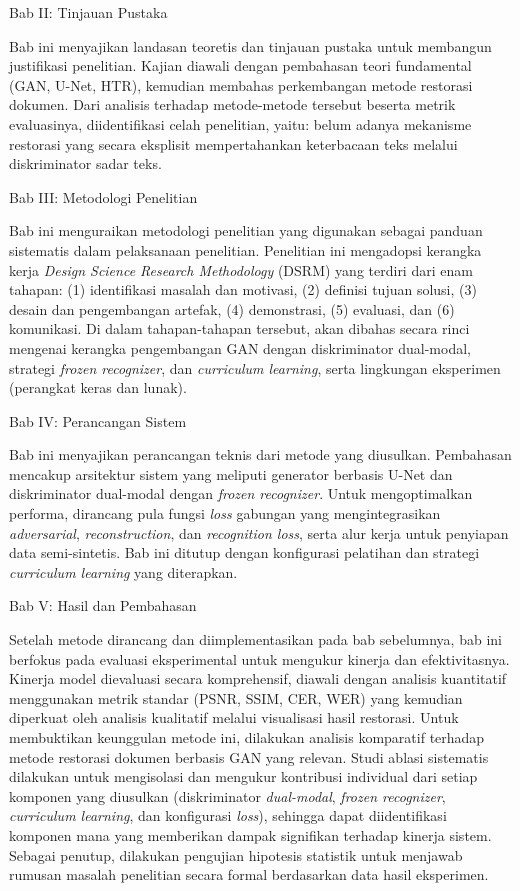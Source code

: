 Bab II: Tinjauan Pustaka

Bab ini menyajikan landasan teoretis dan tinjauan pustaka untuk membangun justifikasi penelitian. Kajian diawali dengan pembahasan teori fundamental (GAN, U-Net, HTR), kemudian membahas perkembangan metode restorasi dokumen. Dari analisis terhadap metode-metode tersebut beserta metrik evaluasinya, diidentifikasi celah penelitian, yaitu: belum adanya mekanisme restorasi yang secara eksplisit mempertahankan keterbacaan teks melalui diskriminator sadar teks.


Bab III: Metodologi Penelitian

Bab ini menguraikan metodologi penelitian yang digunakan sebagai panduan sistematis dalam pelaksanaan penelitian. Penelitian ini mengadopsi kerangka kerja \textit{Design Science Research Methodology} (DSRM) yang terdiri dari enam tahapan: (1) identifikasi masalah dan motivasi, (2) definisi tujuan solusi, (3) desain dan pengembangan artefak, (4) demonstrasi, (5) evaluasi, dan (6) komunikasi. Di dalam tahapan-tahapan tersebut, akan dibahas secara rinci mengenai kerangka pengembangan GAN dengan diskriminator dual-modal, strategi \textit{frozen recognizer}, dan \textit{curriculum learning}, serta lingkungan eksperimen (perangkat keras dan lunak).


Bab IV: Perancangan Sistem

Bab ini menyajikan perancangan teknis dari metode yang diusulkan. Pembahasan mencakup arsitektur sistem yang meliputi generator berbasis U-Net dan diskriminator dual-modal dengan \textit{frozen recognizer}. Untuk mengoptimalkan performa, dirancang pula fungsi \textit{loss} gabungan yang mengintegrasikan \textit{adversarial}, \textit{reconstruction}, dan \textit{recognition loss}, serta alur kerja untuk penyiapan data semi-sintetis. Bab ini ditutup dengan konfigurasi pelatihan dan strategi \textit{curriculum learning} yang diterapkan.


Bab V: Hasil dan Pembahasan

Setelah metode dirancang dan diimplementasikan pada bab sebelumnya, bab ini berfokus pada evaluasi eksperimental untuk mengukur kinerja dan efektivitasnya. Kinerja model dievaluasi secara komprehensif, diawali dengan analisis kuantitatif menggunakan metrik standar (PSNR, SSIM, CER, WER) yang kemudian diperkuat oleh analisis kualitatif melalui visualisasi hasil restorasi. Untuk membuktikan keunggulan metode ini, dilakukan analisis komparatif terhadap metode restorasi dokumen berbasis GAN yang relevan. Studi ablasi sistematis dilakukan untuk mengisolasi dan mengukur kontribusi individual dari setiap komponen yang diusulkan (diskriminator \textit{dual-modal}, \textit{frozen recognizer}, \textit{curriculum learning}, dan konfigurasi \textit{loss}), sehingga dapat diidentifikasi komponen mana yang memberikan dampak signifikan terhadap kinerja sistem. Sebagai penutup, dilakukan pengujian hipotesis statistik untuk menjawab rumusan masalah penelitian secara formal berdasarkan data hasil eksperimen.


